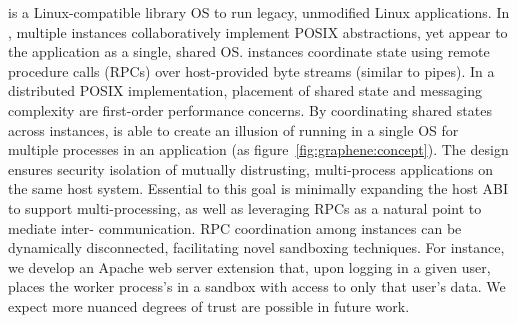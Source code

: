 {\bf \graphene{}} is a Linux-compatible library OS
to run legacy, unmodified Linux applications.
In \graphene{}, multiple \libos{} instances collaboratively implement
POSIX abstractions,
yet appear to the application
as a single, shared OS.
\graphene{} instances coordinate state using remote procedure calls (RPCs) over
host-provided byte streams (similar to pipes).
In a distributed POSIX implementation, placement of shared state and messaging complexity
are first-order performance concerns.
By coordinating shared states across \libos{} instances,
\graphene{} is able to create an illusion 
of running in a single OS
for multiple processes in an application (as figure~\ref{fig:graphene:concept}).
The \graphene{} design ensures security isolation of
mutually distrusting, multi-process
applications on the same host system.
Essential to this goal is
minimally expanding the host ABI to support multi-processing,
as well as leveraging RPCs as a natural point to mediate inter-\picoproc{} communication.
RPC coordination among \graphene{} instances can be dynamically disconnected, facilitating novel sandboxing
techniques.  For instance, we develop an Apache web server extension that, upon logging in a given user,
places the worker process's \libos{} in a sandbox with access to only that user's data.
We expect more nuanced degrees of trust are possible in future work.

